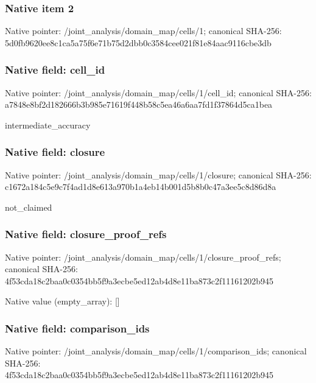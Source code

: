 \documentclass[10pt,a4paper]{article}
\begin{document}
\subsubsection{Native item 2}
Native pointer: /joint\_\allowbreak{}analysis/domain\_\allowbreak{}map/cells/1; canonical SHA-256: 5d0fb9620ee8c1ca5a75f6e71b75d2dbb0c3584cee021f81e84aac9116cbe3db

\subsubsection{Native field: cell\_\allowbreak{}id}
Native pointer: /joint\_\allowbreak{}analysis/domain\_\allowbreak{}map/cells/1/cell\_\allowbreak{}id; canonical SHA-256: a7848e8bf2d182666b3b985e71619f448b58c5ea46a6aa7fd1f37864d5ca1bea

\begingroup\raggedright\sloppy intermediate\_\allowbreak{}accuracy\par\endgroup

\subsubsection{Native field: closure}
Native pointer: /joint\_\allowbreak{}analysis/domain\_\allowbreak{}map/cells/1/closure; canonical SHA-256: c1672a184c5e9c7f4ad1d8e613a970b1a4eb14b001d5b8b0c47a3ee5c8d86d8a

\begingroup\raggedright\sloppy not\_\allowbreak{}claimed\par\endgroup

\subsubsection{Native field: closure\_\allowbreak{}proof\_\allowbreak{}refs}
Native pointer: /joint\_\allowbreak{}analysis/domain\_\allowbreak{}map/cells/1/closure\_\allowbreak{}proof\_\allowbreak{}refs; canonical SHA-256: 4f53cda18c2baa0c0354bb5f9a3ecbe5ed12ab4d8e11ba873c2f11161202b945

Native value (empty\_\allowbreak{}array): []

\subsubsection{Native field: comparison\_\allowbreak{}ids}
Native pointer: /joint\_\allowbreak{}analysis/domain\_\allowbreak{}map/cells/1/comparison\_\allowbreak{}ids; canonical SHA-256: 4f53cda18c2baa0c0354bb5f9a3ecbe5ed12ab4d8e11ba873c2f11161202b945
\end{document}
